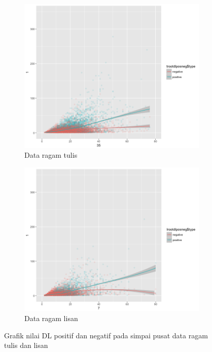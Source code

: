 \begin{figure}
\centering

\begin{subfigure}{.8\linewidth}
  \centering
  \includegraphics[width=1\linewidth] {pics/tulisroot_DLposneg.png} 
	\caption{Data ragam tulis}
	\label{fig:tulisroot_DLposneg} 
\end{subfigure}
%
\begin{subfigure}{.8\linewidth}
  \centering
  \includegraphics[width=1\linewidth]{pics/lisanroot_DLposneg.png} 
	\caption{Data ragam lisan}
	\label{fig:lisanroot_DLposneg} 
\end{subfigure}

\caption{Grafik nilai DL positif dan negatif pada simpai pusat data ragam tulis dan lisan}
\label{fig:rootDL_posneg}
\end{figure}

